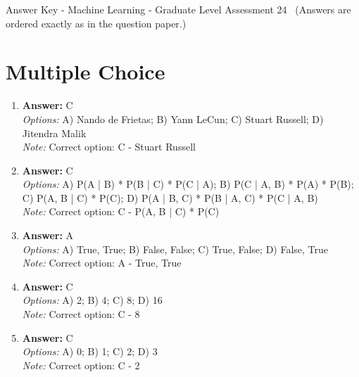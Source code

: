 \documentclass[12pt]{article}
\begin{document}
\begin{center}
Answer Key - Machine Learning - Graduate Level Assessment 24 \
\small (Answers are ordered exactly as in the question paper.)
\end{center}

\section*{Multiple Choice}
\begin{enumerate}[label=\arabic*.]
\item \textbf{Answer:} C
\\ \textit{Options:} A) Nando de Frietas; B) Yann LeCun; C) Stuart Russell; D) Jitendra Malik
\\ \textit{Note:} Correct option: C - Stuart Russell
\item \textbf{Answer:} C
\\ \textit{Options:} A) P(A | B) * P(B | C) * P(C | A); B) P(C | A, B) * P(A) * P(B); C) P(A, B | C) * P(C); D) P(A | B, C) * P(B | A, C) * P(C | A, B)
\\ \textit{Note:} Correct option: C - P(A, B | C) * P(C)
\item \textbf{Answer:} A
\\ \textit{Options:} A) True, True; B) False, False; C) True, False; D) False, True
\\ \textit{Note:} Correct option: A - True, True
\item \textbf{Answer:} C
\\ \textit{Options:} A) 2; B) 4; C) 8; D) 16
\\ \textit{Note:} Correct option: C - 8
\item \textbf{Answer:} C
\\ \textit{Options:} A) 0; B) 1; C) 2; D) 3
\\ \textit{Note:} Correct option: C - 2
\end{enumerate}
\end{document}
